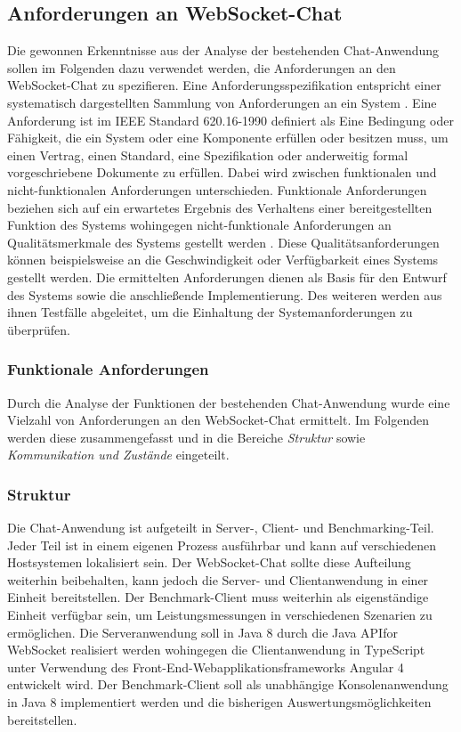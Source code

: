 \documentclass[11pt,a4paper,titlepage]{scrartcl}
\numberwithin{equation}{section}
\begin{document}
\subsection{Anforderungen an WebSocket-Chat}
Die gewonnen Erkenntnisse aus der Analyse der bestehenden Chat-Anwendung sollen im Folgenden dazu verwendet werden, die Anforderungen an den WebSocket-Chat zu spezifieren. Eine Anforderungsspezifikation entspricht einer systematisch dargestellten Sammlung von Anforderungen an ein System \autocite[43]{pohl_basiswissen_2009}. Eine Anforderung ist im IEEE Standard 620.16-1990 definiert als \glqq Eine Bedingung oder Fähigkeit, die ein System oder eine Komponente erfüllen oder besitzen muss, um einen Vertrag, einen Standard, eine Spezifikation oder anderweitig formal vorgeschriebene Dokumente zu erfüllen.\grqq{} Dabei wird zwischen funktionalen und nicht-funktionalen Anforderungen unterschieden. Funktionale Anforderungen beziehen sich auf ein erwartetes Ergebnis des Verhaltens einer bereitgestellten Funktion des Systems wohingegen nicht-funktionale Anforderungen an Qualitätsmerkmale des Systems gestellt werden \autocite[16]{pohl_basiswissen_2009}. Diese Qualitätsanforderungen können beispielsweise an die Geschwindigkeit oder Verfügbarkeit eines Systems gestellt werden. Die ermittelten Anforderungen dienen als Basis für den Entwurf des Systems sowie die anschließende Implementierung. Des weiteren werden aus ihnen Testfälle abgeleitet, um die Einhaltung der Systemanforderungen zu überprüfen. 

\subsubsection{Funktionale Anforderungen}
Durch die Analyse der Funktionen der bestehenden Chat-Anwendung wurde eine Vielzahl von Anforderungen an den WebSocket-Chat ermittelt. Im Folgenden werden diese zusammengefasst und in die Bereiche \textit{Struktur} sowie \textit{Kommunikation und Zustände} eingeteilt.

\subsubsection*{Struktur}
Die Chat-Anwendung ist aufgeteilt in Server-, Client- und Benchmarking-Teil. Jeder Teil ist in einem eigenen Prozess ausführbar und kann auf verschiedenen Hostsystemen lokalisiert sein. Der WebSocket-Chat sollte diese Aufteilung weiterhin beibehalten, kann jedoch die Server- und Clientanwendung in einer Einheit bereitstellen. Der Benchmark-Client muss weiterhin als eigenständige Einheit verfügbar sein, um Leistungsmessungen in verschiedenen Szenarien zu ermöglichen. Die Serveranwendung soll in Java 8 durch die Java API\texttrademark for WebSocket realisiert werden wohingegen die Clientanwendung in TypeScript unter Verwendung des Front-End-Webapplikationsframeworks Angular 4 entwickelt wird. Der Benchmark-Client soll als unabhängige Konsolenanwendung in Java 8 implementiert werden und die bisherigen Auswertungsmöglichkeiten bereitstellen.\\
\end{document}
